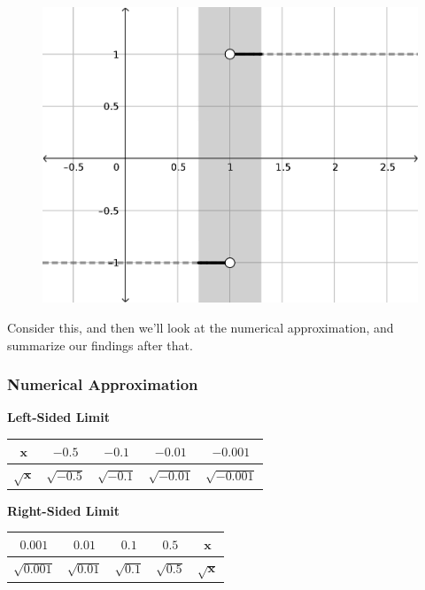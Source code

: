 \begin{figure}
  \includegraphics[scale=0.5]{./1_limits/images/1-2_graph3.png}
  \centering
\end{figure}

Consider this, and then we'll look at the numerical approximation, and summarize our findings after that.

\subsubsection*{Numerical Approximation}

\textbf{Left-Sided Limit}

\begin{tabular}{ccccc} \toprule
  $\bm{x}$ & $-0.5$ & $-0.1$ & $-0.01$ & $-0.001$ \\ \midrule
  $\bm{\sqrt{x}}$ & $\sqrt{-0.5}$ & $\sqrt{-0.1}$ & $\sqrt{-0.01}$ & $\sqrt{-0.001}$\\ \bottomrule
\end{tabular}

\begin{flushright}
  \textbf{Right-Sided Limit}

  \begin{tabular}{ccccc} \toprule
    $0.001$ & $0.01$ & $0.1$ & $0.5$ & $\bm{x}$ \\ \midrule
    $\sqrt{0.001}$ & $\sqrt{0.01}$ & $\sqrt{0.1}$ & $\sqrt{0.5}$ & $\bm{\sqrt{x}}$ \\ \bottomrule
  \end{tabular}
\end{flushright}

